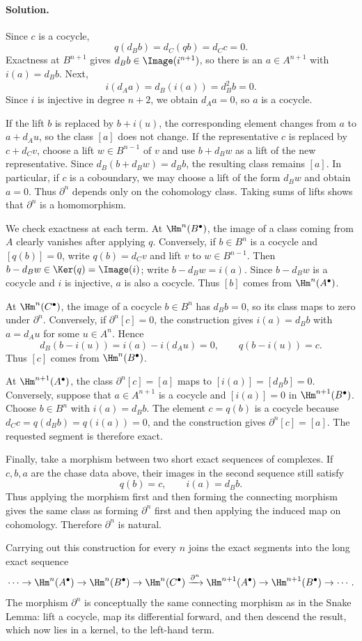 \paragraph{Solution.}
\hypertarget{o014.mastery.diagram-chasing.001.sol08}{ }
Since $c$ is a cocycle,
\[
	q(d_Bb)=d_C(qb)=d_Cc=0.
\]
Exactness at $B^{n+1}$ gives
$d_Bb\in\Image(i^{n+1})$, so there is an $a\in A^{n+1}$ with
$i(a)=d_Bb$. Next,
\[
	i(d_Aa)=d_B(i(a))=d_B^2b=0.
\]
Since $i$ is injective in degree $n+2$, we obtain $d_Aa=0$, so $a$ is a
cocycle.

If the lift $b$ is replaced by $b+i(u)$, the corresponding element changes
from $a$ to $a+d_Au$, so the class $[a]$ does not change. If the
representative $c$ is replaced by $c+d_Cv$, choose a lift $w\in B^{n-1}$
of $v$ and use $b+d_Bw$ as a lift of the new representative. Since
$d_B(b+d_Bw)=d_Bb$, the resulting class remains $[a]$. In particular, if
$c$ is a coboundary, we may choose a lift of the form $d_Bw$ and obtain
$a=0$. Thus $\partial^n$ depends only on the cohomology class. Taking sums
of lifts shows that $\partial^n$ is a homomorphism.

We check exactness at each term. At $\Hm^n(B^\bullet)$, the image of a
class coming from $A$ clearly vanishes after applying $q$. Conversely, if
$b\in B^n$ is a cocycle and $[q(b)]=0$, write
$q(b)=d_Cv$ and lift $v$ to $w\in B^{n-1}$. Then
$b-d_Bw\in\Ker(q)=\Image(i)$; write $b-d_Bw=i(a)$. Since $b-d_Bw$ is a
cocycle and $i$ is injective, $a$ is also a cocycle. Thus $[b]$ comes from
$\Hm^n(A^\bullet)$.

At $\Hm^n(C^\bullet)$, the image of a cocycle $b\in B^n$ has $d_Bb=0$,
so its class maps to zero under $\partial^n$. Conversely, if
$\partial^n[c]=0$, the construction gives $i(a)=d_Bb$ with $a=d_Au$ for
some $u\in A^n$. Hence
\[
	d_B(b-i(u))=i(a)-i(d_Au)=0,
	\qquad q(b-i(u))=c.
\]
Thus $[c]$ comes from $\Hm^n(B^\bullet)$.

At $\Hm^{n+1}(A^\bullet)$, the class $\partial^n[c]=[a]$ maps to
$[i(a)]=[d_Bb]=0$. Conversely, suppose that $a\in A^{n+1}$ is a cocycle
and $[i(a)]=0$ in $\Hm^{n+1}(B^\bullet)$. Choose $b\in B^n$ with
$i(a)=d_Bb$. The element $c=q(b)$ is a cocycle because
$d_Cc=q(d_Bb)=q(i(a))=0$, and the construction gives
$\partial^n[c]=[a]$. The requested segment is therefore exact.

Finally, take a morphism between two short exact sequences of complexes. If
$c,b,a$ are the chase data above, their images in the second sequence still
satisfy
\[
	q(b)=c,\qquad i(a)=d_Bb.
\]
Thus applying the morphism first and then forming the connecting morphism
gives the same class as forming $\partial^n$ first and then applying the
induced map on cohomology. Therefore $\partial^n$ is natural.

Carrying out this construction for every $n$ joins the exact segments into
the long exact sequence
\[
	\cdots\to\Hm^n(A^\bullet)\to\Hm^n(B^\bullet)\to\Hm^n(C^\bullet)
	\xrightarrow{\partial^n}\Hm^{n+1}(A^\bullet)\to\Hm^{n+1}(B^\bullet)
	\to\cdots.
\]
The morphism $\partial^n$ is conceptually the same connecting morphism as in
the Snake Lemma: lift a cocycle, map its differential forward, and then
descend the result, which now lies in a kernel, to the left-hand term.

